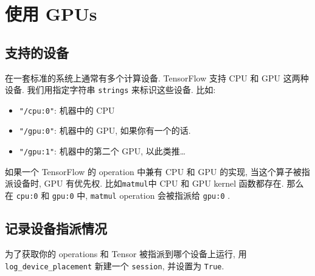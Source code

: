 

\section{使用 GPUs }\label{ux4f7fux7528-gpus}

\subsection{支持的设备 }\label{ux652fux6301ux7684ux8bbeux5907}

在一套标准的系统上通常有多个计算设备. TensorFlow 支持 CPU 和 GPU
这两种设备. 我们用指定字符串 \texttt{strings} 来标识这些设备. 比如:

\begin{itemize}
\tightlist
\item
  \texttt{"/cpu:0"}: 机器中的 CPU
\item
  \texttt{"/gpu:0"}: 机器中的 GPU, 如果你有一个的话.
\item
  \texttt{"/gpu:1"}: 机器中的第二个 GPU, 以此类推\ldots{}
\end{itemize}

如果一个 TensorFlow 的 operation 中兼有 CPU 和 GPU 的实现,
当这个算子被指派设备时, GPU 有优先权. 比如\texttt{matmul}中 CPU 和 GPU
kernel 函数都存在. 那么在 \texttt{cpu:0} 和 \texttt{gpu:0} 中,
\texttt{matmul} operation 会被指派给 \texttt{gpu:0} .

\subsection{记录设备指派情况
}\label{ux8bb0ux5f55ux8bbeux5907ux6307ux6d3eux60c5ux51b5}

为了获取你的 operations 和 Tensor 被指派到哪个设备上运行, 用
\texttt{log\_device\_placement} 新建一个 \texttt{session}, 并设置为
\texttt{True}.

\begin{Shaded}
\begin{Highlighting}[]
\OperatorTok{=} \NormalTok{tf.constant([}\NormalTok{, }\NormalTok{, }\NormalTok{, }\NormalTok{, }\NormalTok{, }\NormalTok{], shape}\OperatorTok{=}\NormalTok{[}\NormalTok{, }\NormalTok{], name}\OperatorTok{=}\NormalTok{)}
\OperatorTok{=} \NormalTok{tf.constant([}\NormalTok{, }\NormalTok{, }\NormalTok{, }\NormalTok{, }\NormalTok{, }\NormalTok{], shape}\OperatorTok{=}\NormalTok{[}\NormalTok{, }\NormalTok{], name}\OperatorTok{=}\NormalTok{)}
\OperatorTok{=} 
\OperatorTok{=} \OperatorTok{=}\OperatorTok{=}\NormalTok{))}
 
\end{Highlighting}
\end{Shaded}


